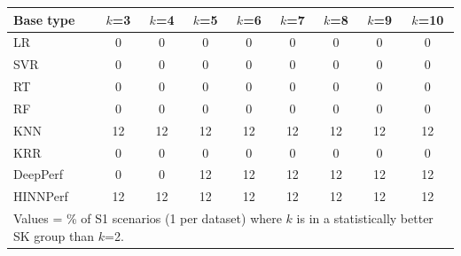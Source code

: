 \begin{tabular}{lcccccccc}
\toprule
Base type & $k$=3 & $k$=4 & $k$=5 & $k$=6 & $k$=7 & $k$=8 & $k$=9 & $k$=10 \\
\midrule
LR & 0 & 0 & 0 & 0 & 0 & 0 & 0 & 0 \\
SVR & 0 & 0 & 0 & 0 & 0 & 0 & 0 & 0 \\
RT & 0 & 0 & 0 & 0 & 0 & 0 & 0 & 0 \\
RF & 0 & 0 & 0 & 0 & 0 & 0 & 0 & 0 \\
KNN & 12 & 12 & 12 & 12 & 12 & 12 & 12 & 12 \\
KRR & 0 & 0 & 0 & 0 & 0 & 0 & 0 & 0 \\
DeepPerf & 0 & 0 & 12 & 12 & 12 & 12 & 12 & 12 \\
HINNPerf & 12 & 12 & 12 & 12 & 12 & 12 & 12 & 12 \\
\bottomrule
\multicolumn{9}{l}{\footnotesize Values = \% of S1 scenarios (1 per dataset) where $k$ is in a statistically better SK group than $k$=2.}} \\
\end{tabular}
